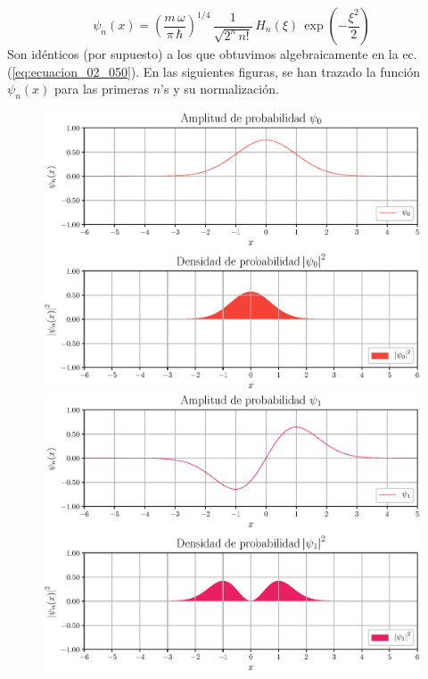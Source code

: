 \begin{equation}
\psi_{n} (x) = \left( \dfrac{m \, \omega}{\pi \, \hbar} \right)^{1/4} \, \dfrac{1}{\sqrt{2^{n} \, n!}} \, H_{n} (\xi) \, \exp \left( - \dfrac{\xi^{2}}{2} \right)
\label{eq:ecuacion_02_069}
\end{equation}
Son idénticos (por supuesto) a los que obtuvimos algebraicamente en la ec. (\ref{eq:ecuacion_02_050}).
\newpage
En las siguientes figuras, se han trazado la función $\psi_{n} (x)$ para las primeras $n$'s y su normalización.
\begin{figure}[H]
    \centering
    \includegraphics[scale=0.6]{Imagenes/Funcion_Onda_00.eps}
    \includegraphics[scale=0.6]{Imagenes/Funcion_Onda_01.eps}
\end{figure}
